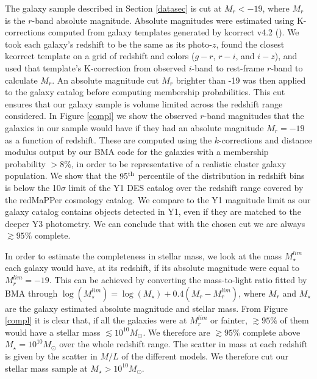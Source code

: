 The galaxy sample described in Section \ref{datasec} is cut at $M_r < -19$, where $M_r$ is the $r$-band absolute magnitude. Absolute magnitudes were estimated using K-corrections computed from galaxy templates generated by kcorrect v4.2 (\citealt{blanton}).  We took each galaxy's redshift to be the same as its photo-$z$, found the closest kcorrect template on a grid of redshift and colors ($g-r$, $r-i$, and $i-z$), and used that template's K-correction from observed $i$-band to rest-frame $r$-band to calculate $M_r$.  An absolute magnitude cut $M_r$ brighter than -19 was then applied to the galaxy catalog before computing membership probabilities. This cut ensures that our galaxy sample is  volume limited across the redshift range considered. In Figure \ref{compl} we show the observed $r$-band magnitudes that the galaxies in our sample would have if they had an absolute magnitude $M_r =-19$ as a function of redshift. These are computed using the $k$-corrections and distance modulus output by our BMA code for the galaxies with a membership probability $>8\%$, in order to be representative of a realistic cluster galaxy population. We show that the $95^{{\rm th}}$ percentile of the distribution in redshift bins is below the 10$\sigma$ limit of the Y1 DES catalog over the redshift range covered by the redMaPPer cosmology catalog. We compare to the Y1 magnitude limit as our galaxy catalog contains objects detected in Y1, even if they are matched to the deeper Y3 photometry. We can conclude that with the chosen cut we are always $\gtrsim 95\%$ complete.


In order to estimate the completeness in stellar mass, we look at the mass $M_\star^{lim}$ each galaxy would have, at its redshift, if its absolute magnitude were equal to $M_r^{lim} =-19$. This can be achieved by converting the mass-to-light ratio fitted by BMA through $\log{(M_\star^{lim})} = \log{(M_\star)} + 0.4(M_r - M_r^{lim})$, where $M_r$ and $M_\star$ are the galaxy estimated absolute magnitude and stellar mass. From Figure \ref{compl} it is clear that, if all the galaxies were at $M_r^{lim}$ or fainter, $\gtrsim 95\%$ of them would have a stellar mass $\lesssim 10^{10} M_\odot$. We therefore are $\gtrsim 95\%$ complete above $M_\star =10^{10} M_\odot$ over the whole redshift range. The scatter in mass at each redshift is given by the scatter in $M/L$ of the different models. We therefore cut our stellar mass sample at $M_\star >10^{10} M_\odot$.

